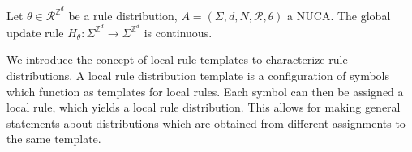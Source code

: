 \documentclass[runningheads]{llncs}
\newcommand{\Z}{\mathbb{Z}}
\newcommand{\confspace}{\Sigma^{\Z^d}}
\begin{document}
\begin{lemma}  \label{cont}
\emph{\cite{dennuz}} Let $\theta \in \mathcal{R}^{\Z^d}$ be a rule distribution, $A = (\Sigma, d, N, \mathcal{R}, \theta)$ a NUCA. The global update rule $H_\theta:\confspace \rightarrow \confspace$ is continuous.
\end{lemma}

%
%
%
%

We introduce the concept of local rule templates to characterize rule distributions. A local rule distribution template is a configuration of symbols which function as templates for local rules. Each symbol can then be assigned a local rule, which yields a local rule distribution. This allows for making general statements about distributions which are obtained from different assignments to the same template.
\end{document}
